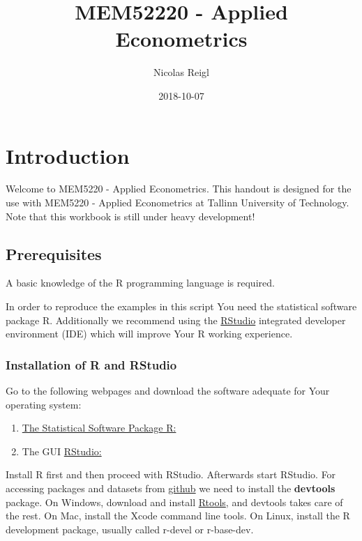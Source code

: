 \documentclass[]{book}
\title{MEM52220 - Applied Econometrics}
\author{Nicolas Reigl}
\date{2018-10-07}
\providecommand{\tightlist}{%
  \setlength{\itemsep}{0pt}\setlength{\parskip}{0pt}}
\begin{document}
\maketitle

{
\setcounter{tocdepth}{1}
\tableofcontents
}
\hypertarget{introduction}{%
\chapter*{Introduction}\label{introduction}}

Welcome to MEM5220 - Applied Econometrics. This handout is designed for
the use with MEM5220 - Applied Econometrics at Tallinn University of
Technology. Note that this workbook is still under heavy development!

\hypertarget{prerequisites}{%
\section*{Prerequisites}\label{prerequisites}}

A basic knowledge of the R \citep{team2013r} programming language is
required.

In order to reproduce the examples in this script You need the
statistical software package R. Additionally we recommend using the
\href{https://www.rstudio.com}{RStudio} integrated developer environment
(IDE) which will improve Your R working experience.

\hypertarget{installation-of-r-and-rstudio}{%
\subsection*{Installation of R and
RStudio}\label{installation-of-r-and-rstudio}}

Go to the following webpages and download the software adequate for Your
operating system:

\begin{enumerate}
\def\labelenumi{\arabic{enumi}.}
\tightlist
\item
  \href{http://cran.r-project.org}{The Statistical Software Package R:}
\item
  The GUI \href{https://www.rstudio.com}{RStudio:}
\end{enumerate}

Install R first and then proceed with RStudio. Afterwards start RStudio.
For accessing packages and datasets from
\href{https://github.com/}{github} we need to install the
\textbf{devtools} package. On Windows, download and install
\href{https://cran.r-project.org/bin/windows/Rtools/}{Rtools}, and
devtools takes care of the rest. On Mac, install the Xcode command line
tools. On Linux, install the R development package, usually called
r-devel or r-base-dev.
\end{document}
